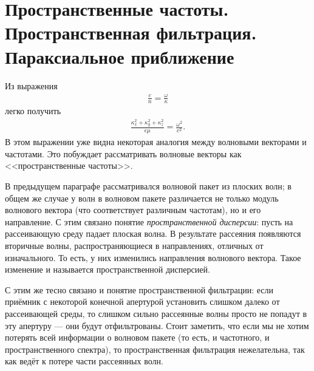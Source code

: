 \section{Пространственные частоты. Пространственная фильтрация. Параксиальное
приближение}
Из выражения
\begin{align*}
  \frac{c}{n} = \frac{\omega}{\kappa}
\end{align*}
легко получить
\begin{align*}
  \frac{\kappa^2_x + \kappa^2_y + \kappa^2_z}{\epsilon\mu}
  = \frac{\omega^2}{c^2}.
\end{align*}
В этом выражении уже видна некоторая аналогия между волновыми векторами и частотами.
Это побуждает рассматривать волновые векторы как <<пространственные частоты>>.

В предыдущем параграфе рассматривался волновой пакет из плоских волн; в общем же
случае у волн в волновом пакете различается не только модуль волнового вектора
(что соответствует различным частотам), но и его направление. С этим связано
понятие \emph{пространственной дисперсии}: пусть на рассеивающую среду падает
плоская волна. В результате рассеяния появляются вторичные волны,
распространяющиеся в направлениях, отличных от изначального. То есть, у них
изменились направления волнового вектора. Такое изменение и называется
пространственной дисперсией.

С этим же тесно связано и понятие пространственной фильтрации: если приёмник
с некоторой конечной апертурой установить слишком далеко от рассеивающей среды,
то слишком сильно рассеянные волны просто не попадут в эту апертуру --- они будут
отфильтрованы. Стоит заметить, что если мы не хотим потерять всей информации
о волновом пакете (то есть, и частотного, и пространственного спектра), то
пространственная фильтрация нежелательна, так как ведёт к потере части
рассеянных волн.

